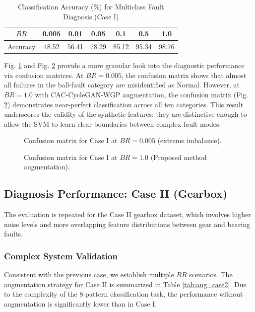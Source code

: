 \begin{table}[htbp]
\centering
\caption{Classification Accuracy (\%) for Multiclass Fault Diagnosis (Case I)}
\label{tab:acc_case1}
\begin{tabular}{ccccccc}
\hline
$BR$ & 0.005 & 0.01 & 0.05 & 0.1 & 0.5 & 1.0 \\ \hline
Accuracy & 48.52 & 56.41 & 78.29 & 85.12 & 95.34 & 98.76 \\
\hline
\end{tabular}
\end{table}

Fig. \ref{fig:conf_1} and Fig. \ref{fig:conf_2} provide a more granular look into the diagnostic performance via confusion matrices. At $BR=0.005$, the confusion matrix shows that almost all failures in the ball-fault category are misidentified as Normal. However, at $BR=1.0$ with CAC-CycleGAN-WGP augmentation, the confusion matrix (Fig. \ref{fig:conf_2}) demonstrates near-perfect classification across all ten categories. This result underscores the validity of the synthetic features; they are distinctive enough to allow the SVM to learn clear boundaries between complex fault modes.

\begin{figure}[htbp]
\centering
\caption{Confusion matrix for Case I at $BR=0.005$ (extreme imbalance).}
\label{fig:conf_1}
\end{figure}

\begin{figure}[htbp]
\centering
\caption{Confusion matrix for Case I at $BR=1.0$ (Proposed method augmentation).}
\label{fig:conf_2}
\end{figure}

\subsection{Diagnosis Performance: Case II (Gearbox)}
The evaluation is repeated for the Case II gearbox dataset, which involves higher noise levels and more overlapping feature distributions between gear and bearing faults.

\subsubsection{Complex System Validation}
Consistent with the previous case, we establish multiple $BR$ scenarios. The augmentation strategy for Case II is summarized in Table \ref{tab:aug_case2}. Due to the complexity of the 8-pattern classification task, the performance without augmentation is significantly lower than in Case I.

